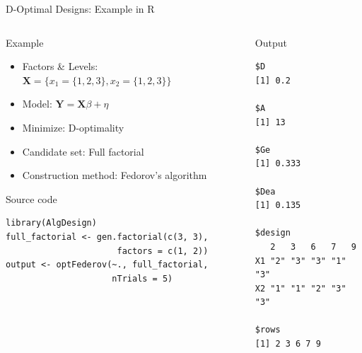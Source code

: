 \documentclass[10pt, compress, aspectratio=169, xcolor={table,usenames,dvipsnames}]{beamer}
\begin{document}
\begin{frame}[fragile,label={sec:org74a9c18}]{D-Optimal Designs: Example in R}
 \begin{columns}
\begin{column}{0.5\columnwidth}
\begin{block}{Example}
\begin{itemize}
\item Factors \& Levels: \(\mathbf{X} = \{x_1 = \{1, 2, 3\}, x_2 = \{1, 2, 3\}\}\)
\item Model: \(\mathbf{Y} = \mathbf{X}\beta + \eta\)
\item Minimize: \alert{D-optimality}
\item Candidate set: \alert{Full factorial}
\item Construction method: \alert{Fedorov's algorithm}
\end{itemize}

\begin{block}{Source code}
\lstset{language=r,label= ,caption= ,captionpos=b,numbers=none}
\begin{lstlisting}
library(AlgDesign)
full_factorial <- gen.factorial(c(3, 3),
                      factors = c(1, 2))
output <- optFederov(~., full_factorial,
                     nTrials = 5)
\end{lstlisting}
\end{block}
\end{block}
\end{column}

\begin{column}{0.5\columnwidth}
\begin{block}{Output}
\scriptsize

\begin{verbatim}
$D
[1] 0.2

$A
[1] 13

$Ge
[1] 0.333

$Dea
[1] 0.135

$design
   2   3   6   7   9
X1 "2" "3" "3" "1" "3"
X2 "1" "1" "2" "3" "3"

$rows
[1] 2 3 6 7 9
\end{verbatim}

\normalsize
\end{block}
\end{column}
\end{columns}
\end{frame}
\end{document}
